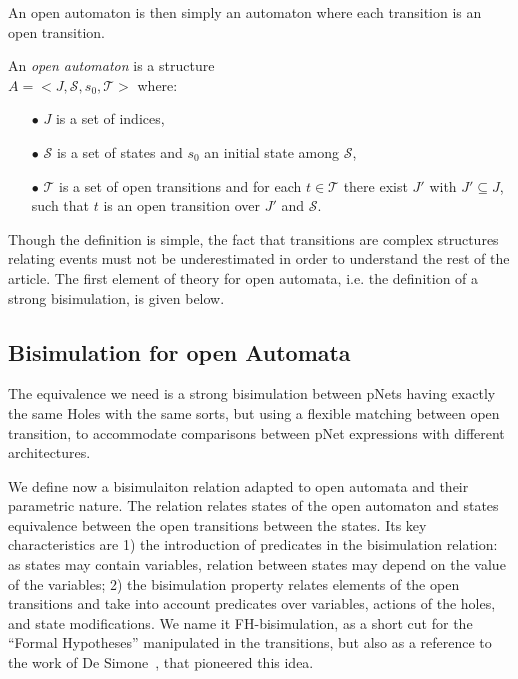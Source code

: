 \documentclass{lncs/llncs}
\begin{document}
An open automaton is then simply an automaton where each transition is an open transition.
\begin{definition}
	\label{def:open-automaton}
	An \emph{open automaton} is a structure\\ $A =
	<J,\mathcal{S},s_0,\mathcal{T}>$ where:
	\begin{itemize}
		\item[$\bullet$]   $J$ is a  set of indices,
		\item[$\bullet$]   $\mathcal{S}$ is a set of states and $s_0$ an initial state
		among $\mathcal{S}$,
		\item[$\bullet$] $\mathcal{T}$ is a set of open transitions and for each
		$t\in \mathcal{T}$ there exist  $J'$ with  $J'
		\subseteq J$, such that $t$ is an open transition over  $J'$
		and  $\mathcal{S}$.
		
	\end{itemize}
\end{definition}
	
Though the definition is simple, the fact that transitions are complex structures relating events must not be underestimated in order to understand the rest of the article. The first element of theory for open automata, i.e. the definition of a strong bisimulation, is given below.


\subsection{Bisimulation for open Automata}
\label{section:bisimulation}


The equivalence we need is a strong bisimulation between
pNets having exactly the same Holes with the same sorts, but using a
flexible matching 
between open transition, to accommodate comparisons between pNet
expressions with different architectures.



We define now a bisimulaiton relation adapted to open automata and their parametric nature. The relation relates states of the open automaton and states equivalence between the open transitions between the states. Its key characteristics are 1) the introduction of predicates in the bisimulation relation: as states may contain variables, relation between states may depend on the value of the variables; 2) the bisimulation property relates elements of the open transitions and take into account predicates over variables, actions of the holes, and state modifications.
 We name it FH-bisimulation,
 as a short cut for the ``Formal Hypotheses'' manipulated in the
 transitions, but also as a reference to the work of De Simone~\cite{deSimone85},
 that pioneered this idea.
\end{document}
